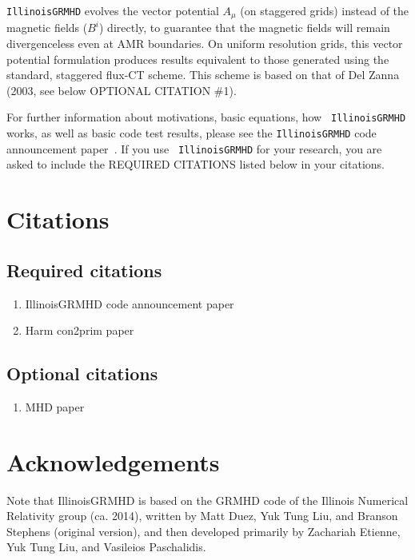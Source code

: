 \documentclass{article}
\begin{document}
{\tt IllinoisGRMHD} evolves the vector potential $A_{\mu}$ (on staggered grids) 
instead of the magnetic fields ($B^i$) directly, to guarantee that the 
magnetic fields will remain divergenceless even at AMR boundaries. On 
uniform resolution grids, this vector potential formulation produces 
results equivalent to those generated using the standard, staggered 
flux-CT scheme. This scheme is based on that of Del Zanna (2003, see
below OPTIONAL CITATION \#1).

For further information about motivations, basic equations, how {\tt
  IllinoisGRMHD} works, as well as basic code test results, please see
the {\tt IllinoisGRMHD} code announcement
paper~\cite{WVUThorns_IllinoisGRMHD_Etienne:2015cea}. If you use {\tt
  IllinoisGRMHD} for your research, you are asked to include the
REQUIRED CITATIONS listed below in your citations.

\section{Citations}
\subsection{Required citations}
\begin{enumerate}
\item IllinoisGRMHD code announcement paper~\cite{WVUThorns_IllinoisGRMHD_Etienne:2015cea}
\item Harm con2prim paper~\cite{WVUThorns_IllinoisGRMHD_Noble:2005gf}
\end{enumerate}

\subsection{Optional citations}
\begin{enumerate}
\item MHD paper~\cite{WVUThorns_IllinoisGRMHD_DelZanna:2002rv}
\end{enumerate}

\section{Acknowledgements}

Note that IllinoisGRMHD
is based on the GRMHD code of the Illinois Numerical Relativity
group (ca. 2014), written by Matt Duez, Yuk Tung Liu, and Branson
Stephens (original version), and then developed primarily by
Zachariah Etienne, Yuk Tung Liu, and Vasileios Paschalidis.
\end{document}
